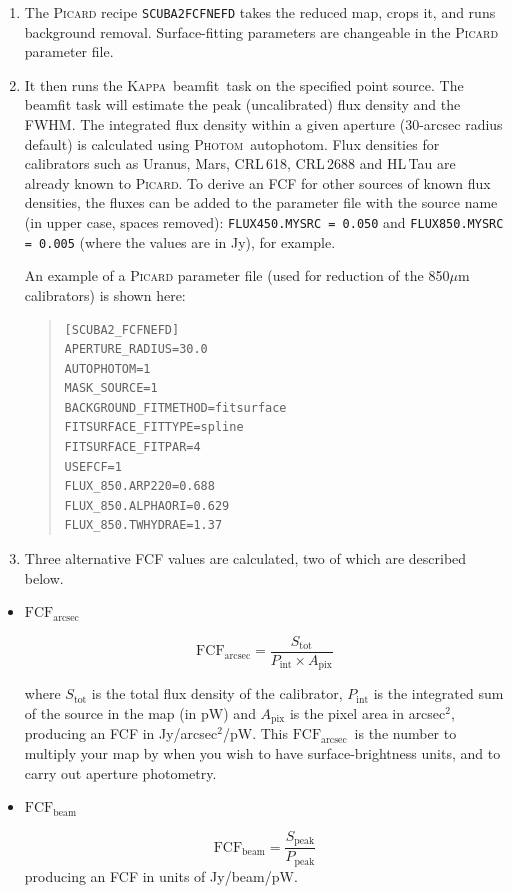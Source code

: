 \documentclass[twoside,11pt]{article}
\newcommand{\xref}[3]{#1}
\renewcommand{\_}{\texttt{\symbol{95}}}
\newenvironment{myquote}{\begin{quote}\begin{small}}{\end{small}\end{quote}}
\newcommand{\fcfb}{$\mathrm{FCF_{beam}}$}
\newcommand{\fcfa}{$\mathrm{FCF_{arcsec}}$}
\newcommand{\Kappa}{\xref{\textsc{Kappa}}{sun95}{}}
\newcommand{\photom}{\xref{\textsc{Photom}}{sun45}{}}
\newcommand{\picard}{\xref{\textsc{Picard}}{sun265}{}}
\newcommand{\drrecipe}[1]{\texttt{#1}}
\newcommand{\task}[1]{\textsf{#1}}
\newcommand{\beamfit}{\xref{\task{beamfit}}{sun95}{BEAMFIT}}
\newcommand{\autophotom}{\xref{\task{autophotom}}{sun45}{AUTOPHOTOM}}
\begin{document}
\begin{enumerate}
\item{The \textsc{Picard} recipe \drrecipe{SCUBA2\_FCFNEFD} takes the reduced
  map, crops it, and runs background removal. Surface-fitting
  parameters are changeable in the \textsc{Picard} parameter file.}
\item{It then runs the \Kappa\ \beamfit\ task on the specified point
  source. The \task{beamfit} task will estimate the peak (uncalibrated)
  flux density and the FWHM. The integrated flux density within a
  given aperture (30-arcsec radius default) is calculated using
  \photom\ \autophotom. Flux densities for calibrators such as Uranus,
  Mars, CRL\,618, CRL\,2688 and HL\,Tau are already known to
  \picard. To derive an FCF for other sources of known flux densities,
  the fluxes can be added to the parameter file with the source name
  (in upper case, spaces removed): \texttt{FLUX\_450.MYSRC = 0.050}
  and \texttt{FLUX\_850.MYSRC = 0.005} (where the values are in Jy),
  for example. }

  An example of a \textsc{Picard} parameter file (used for reduction of the
  850$\mu$m calibrators) is shown here:

\begin{myquote}
\begin{verbatim}
[SCUBA2_FCFNEFD]
APERTURE_RADIUS=30.0
AUTOPHOTOM=1
MASK_SOURCE=1
BACKGROUND_FITMETHOD=fitsurface
FITSURFACE_FITTYPE=spline
FITSURFACE_FITPAR=4
USEFCF=1
FLUX_850.ARP220=0.688
FLUX_850.ALPHAORI=0.629
FLUX_850.TWHYDRAE=1.37
\end{verbatim}
\end{myquote}

\item {Three alternative FCF values are calculated, two of which are
described below.}
\end{enumerate}

\begin{itemize}

\item{\textbf{\fcfa}}

\begin{equation}
\label{eq:fcf_arcsec}
\mathrm{FCF_{arcsec}} = \frac{S_\mathrm{tot}}{P_\mathrm{int} \times
  A_\mathrm{pix}}
\end{equation}

where $S_\mathrm{tot}$ is the total flux density of the calibrator,
$P_\mathrm{int}$ is the integrated sum of the source in the map (in
pW) and $A_\mathrm{pix}$ is the pixel area in arcsec$^2$, producing an
FCF in Jy/arcsec$^2$/pW. This \fcfa\ is the number to
multiply your map by when you wish to have surface-brightness units,
and to carry out aperture photometry.

\item{\textbf{\fcfb}}

\begin{equation}
\label{eq:fcf_beam}
\mathrm{FCF_{beam}} = \frac{S_\mathrm{{peak}}}{P_\mathrm{peak}}
\end{equation}
producing an FCF in units of Jy/beam/pW.
\end{itemize}
\end{document}
